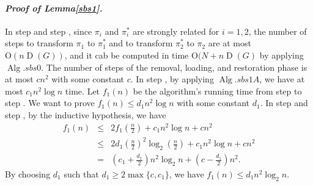 \documentclass[letter,11pt]{article}
\newcommand{\white}{\qquad{\framebox{\rule{0pt}{4pt}}}}
\newcommand{\owari}{\hfill\white}
\theoremstyle{definition}
\theoremstyle{definition}
\DeclareMathOperator{\Alg}{Alg}
\DeclareMathOperator{\D}{D}
\newcommand{\1}{\boldmath$~1~$\unboldmath}
\newcommand{\Ord}{\mathrm{O}}
\newcommand{\qedgo}{\vspace{0.35cm}}
\newcommand{\tume}{\hspace*{0.2em}}
\newcommand{\maru}[1]{{\ooalign{\hfill$\small#1$\hfill\crcr\scalebox{1.3}{$\bigcirc$}}}}
\newenvironment{Proofof}[1]{\expandafter
\paragraph{{\it Proof of #1.}}}{\hspace{5mm}\owari\qedgo}
\begin{document}
\begin{Proofof}{Lemma\tume\ref{sbs1}}
In step \maru{2} and step \maru{7}, since $\pi_i$ and $\pi_i^{\ast}$ are strongly related for $i = 1, 2$, 
the number of steps to transform $\pi_1$ to $\pi_1^{\ast}$ and to transform $\pi_2^{\ast}$ to $\pi_2$ are at most $\Ord (n\D(G))$, and it cab be  computed in time $\Ord (N + n\D(G)$ by applying $\Alg.sbs0$.
The number of steps of the removal, loading, and restoration phase is at most $cn^2$ with some constant $c$.
In step \maru{3}, by applying $\Alg.sbs1A$, we have at most $c_1 n^2 \log n$ time.
Let $f_1(n)$ be the algorithm's running time from step \maru{3} to step \maru{6}.
We want to prove $f_1(n) \le d_1 n^2 \log n$ with some constant $d_1$.
In step \maru{4} and step \maru{5}, by the inductive hypothesis, we have
\begin{eqnarray*}
f_1(n) & \le & 2 f_1(\frac{n}{2}) + c_1 n^2 \log n + c n^2 \\
 & \le & 2 d_1 (\frac{n}{2})^2 \log_2 (\frac{n}{2}) + c_1 n^2 \log n + c n^2 \\
 & = & (c_1 + \frac{d_1}{2} ) n^2 \log_2 n + (c - \frac{d_1}{2} ) n^2.
\end{eqnarray*} 
By choosing $d_1$ such that $d_1 \ge 2\max\{ c, c_1 \}$, we have $f_1(n) \le d_1 n^2 \log_2 n$.        
\end{Proofof} 

\end{document}
